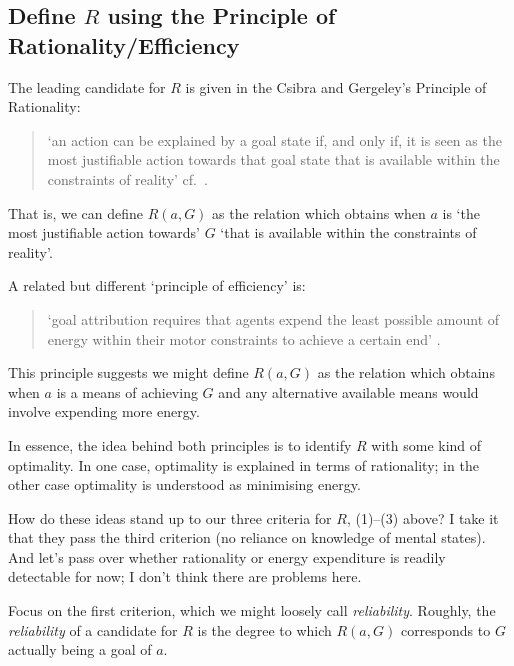 \documentclass[12pt,\papersize]{extarticle}
\begin{document}
\subsection{Define $R$ using the Principle of Rationality/Efficiency}
The leading candidate for $R$ is given in the Csibra and Gergeley's Principle of Rationality:
%
\begin{quote}
`an action can be explained by a goal state if, and only if, it is seen as the most justifiable action towards that goal state that is available within the constraints of reality' \citep[p.\ 255]{Csibra:1998cx} cf.\ \citep{Csibra:2003jv}.
\end{quote}
%
That is, we can define $R(a,G)$ as the relation which obtains when $a$ is `the most justifiable action towards' $G$ `that is available within the constraints of reality'.

A related but different `principle of efficiency' is:
%
\begin{quote}
`goal attribution requires that agents expend the least possible amount of energy within their motor constraints to achieve a certain end' \citep[p.\ 1061]{Southgate:2008el}.
\end{quote}
%
This principle suggests we might define $R(a,G)$ as the relation which obtains when $a$ is a means of achieving $G$ and any alternative available means would involve expending more energy.

In essence, the idea behind both principles is to identify $R$ with some kind of optimality.
In one case, optimality is explained in terms of rationality; in the other case optimality is understood as minimising energy.

How do these ideas stand up to our three criteria for $R$, (1)--(3) above?
I take it that they pass the third criterion (no reliance on knowledge of mental states).
And let's pass over whether rationality or energy expenditure is readily detectable for now; I don't think there are problems here.  

Focus on the first criterion, which we might loosely call \emph{reliability}. 
Roughly, the \emph{reliability} of a candidate for $R$ is the degree to which $R(a,G)$ corresponds to $G$ actually being a goal of $a$.
\end{document}
